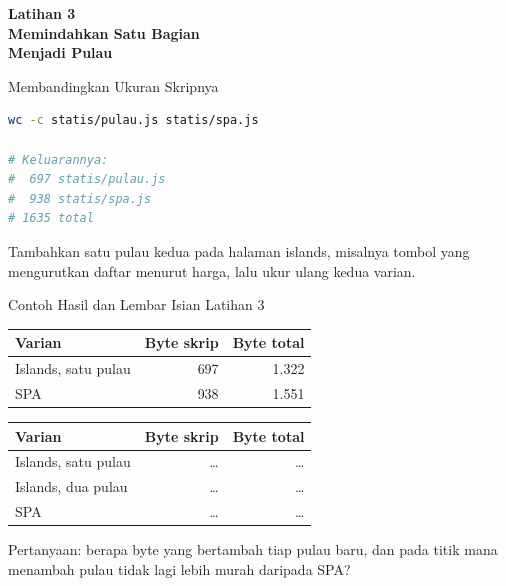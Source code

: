 \documentclass[aspectratio=169, table, 12pt]{beamer}
\begin{document}
\begin{frame}{\hfill}
  \centering
  \Huge{\textbf{Latihan 3\\Memindahkan Satu Bagian\\Menjadi Pulau}}
\end{frame}

\begin{frame}[fragile]{{\Large Membandingkan Ukuran Skripnya}}
  \vspace{2pt}
\begin{lstlisting}[language=bash]
wc -c statis/pulau.js statis/spa.js

# Keluarannya:
#  697 statis/pulau.js
#  938 statis/spa.js
# 1635 total
\end{lstlisting}
  \vspace{4pt}
  {\small Tambahkan satu pulau kedua pada halaman islands, misalnya tombol
  yang mengurutkan daftar menurut harga, lalu ukur ulang kedua varian.}
\end{frame}

\begin{frame}{{\Large Contoh Hasil dan Lembar Isian Latihan 3}}
  \vspace{4pt}
  \centering
  {\footnotesize
  \begin{tabularx}{\textwidth}{Yrr}
    \hline
    \textbf{Varian} & \textbf{Byte skrip} & \textbf{Byte total} \\
    \hline
    Islands, satu pulau & 697 & 1.322 \\
    \hline
    SPA & 938 & 1.551 \\
    \hline
  \end{tabularx}}

  \vspace{6pt}
  \centering
  {\footnotesize
  \begin{tabularx}{\textwidth}{Yrr}
    \hline
    \textbf{Varian} & \textbf{Byte skrip} & \textbf{Byte total} \\
    \hline
    Islands, satu pulau & \dots & \dots \\
    \hline
    Islands, dua pulau & \dots & \dots \\
    \hline
    SPA & \dots & \dots \\
    \hline
  \end{tabularx}}

  \vspace{4pt}
  {\footnotesize Pertanyaan: berapa byte yang bertambah tiap pulau baru, dan
  pada titik mana menambah pulau tidak lagi lebih murah daripada SPA?}
\end{frame}
\end{document}
